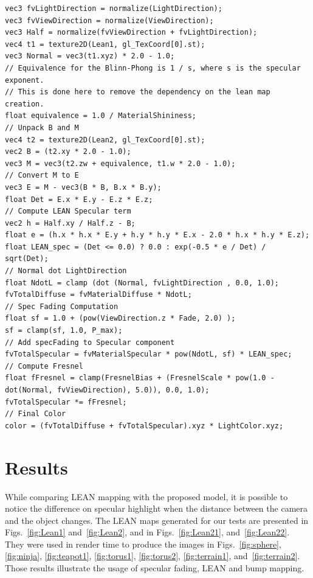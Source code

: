 \documentclass[10pt, conference]{IEEEtran}
\begin{document}
\lstset{basicstyle=\footnotesize,xleftmargin=20pt,numbers=left, breaklines=true, language=C, caption=GLSL pseudocode for specular fading applied as an extension of the LEAN shader in tangent space., label=GLSLCode}
\begin{lstlisting}
vec3 fvLightDirection = normalize(LightDirection);
vec3 fvViewDirection = normalize(ViewDirection);
vec3 Half = normalize(fvViewDirection + fvLightDirection);
vec4 t1 = texture2D(Lean1, gl_TexCoord[0].st);
vec3 Normal = vec3(t1.xyz) * 2.0 - 1.0;
// Equivalence for the Blinn-Phong is 1 / s, where s is the specular exponent.
// This is done here to remove the dependency on the lean map creation.
float equivalence = 1.0 / MaterialShininess;
// Unpack B and M
vec4 t2 = texture2D(Lean2, gl_TexCoord[0].st);
vec2 B = (t2.xy * 2.0 - 1.0);
vec3 M = vec3(t2.zw + equivalence, t1.w * 2.0 - 1.0);
// Convert M to E
vec3 E = M - vec3(B * B, B.x * B.y);
float Det = E.x * E.y - E.z * E.z;
// Compute LEAN Specular term
vec2 h = Half.xy / Half.z - B;
float e = (h.x * h.x * E.y + h.y * h.y * E.x - 2.0 * h.x * h.y * E.z);
float LEAN_spec = (Det <= 0.0) ? 0.0 : exp(-0.5 * e / Det) / sqrt(Det);
// Normal dot LightDirection
float NdotL = clamp (dot (Normal, fvLightDirection , 0.0, 1.0);
fvTotalDiffuse = fvMaterialDiffuse * NdotL;
// Spec Fading Computation
float sf = 1.0 + (pow(ViewDirection.z * Fade, 2.0) );
sf = clamp(sf, 1.0, P_max);
// Add specFading to Specular component
fvTotalSpecular = fvMaterialSpecular * pow(NdotL, sf) * LEAN_spec;
// Compute Fresnel
float fFresnel = clamp(FresnelBias + (FresnelScale * pow(1.0 - dot(Normal, fvViewDirection), 5.0)), 0.0, 1.0);
fvTotalSpecular *= fFresnel;
// Final Color
color = (fvTotalDiffuse + fvTotalSpecular).xyz * LightColor.xyz;
\end{lstlisting}

\section{Results}
\label{sec:results}

While comparing LEAN mapping with the proposed model, it is possible to notice the difference on specular highlight when the distance between the camera and the object changes. The LEAN maps generated for our tests are presented in Figs.~\ref{fig:Lean1} and~\ref{fig:Lean2}, and in Figs.~\ref{fig:Lean21}, and~\ref{fig:Lean22}. They were used in render time to produce the images in Figs.~\ref{fig:sphere}, \ref{fig:ninja}, \ref{fig:teapot1}, \ref{fig:torus1}, \ref{fig:torus2}, \ref{fig:terrain1}, and~\ref{fig:terrain2}. Those results illustrate the usage of specular fading, LEAN and bump mapping.
\end{document}
